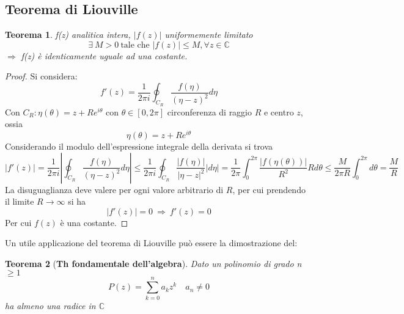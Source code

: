 \documentclass[twoside]{article}
\newtheorem{theorem}{Teorema}[section]
\begin{document}
\subsection{Teorema di Liouville}
\begin{theorem}
f(z) analitica intera, $|f(z)|$ uniformemente limitato
\begin{equation}
    \exists \ M>0 \ \text{tale che\ } |f(z)|\le M, \forall z\in \mathds{C}
\end{equation}
$\Longrightarrow$ f(z) è identicamente uguale ad una costante.\\
\end{theorem}
\begin{proof}
Si considera:
\begin{equation}
    f'(z)=\frac{1}{2\pi i}\oint_{C_R}\frac{f(\eta)}{(\eta-z)^2}d\eta
\end{equation}
Con $C_R:\eta(\theta)=z+Re^{i\theta}$ con $\theta\in[0,2\pi]$ circonferenza di raggio $R$ e centro $z$, ossia
\begin{equation}
    \eta(\theta)=z+Re^{i\theta}
\end{equation}
Considerando il modulo dell'espressione integrale della derivata si trova
\begin{equation*}
    |f'(z)|=\frac{1}{2\pi i}\left|\oint_{C_R}\frac{f(\eta)}{(\eta - z)^2}d\eta\right|\le \frac{1}{2\pi i} \oint_{C_R}\frac{|f(\eta)|}{|\eta - z|^2}|d\eta|=\frac{1}{2\pi}\int_0^{2\pi}\frac{|f(\eta(\theta))|}{R^2}Rd\theta \le \frac{M}{2\pi R}\int_0^{2\pi}d\theta=\frac{M}{R}
\end{equation*}
La disuguaglianza deve valere per ogni valore arbitrario di $R$, per cui prendendo il limite $R\to \infty$ si ha
\begin{equation}
    |f'(z)|=0 \ \Rightarrow \ f'(z)=0
\end{equation}
Per cui $f(z)$ è una costante.

\end{proof}
Un utile applicazione del teorema di Liouville può essere la dimostrazione del:
\begin{theorem}[\textbf{Th fondamentale dell'algebra}]
Dato un polinomio di grado n$\ge 1$
\begin{equation}
    P(z)=\sum_{k=0}^na_kz^k \quad a_n\ne0
\end{equation}
ha almeno una radice in $\mathds{C}$
\end{theorem}
\end{document}
